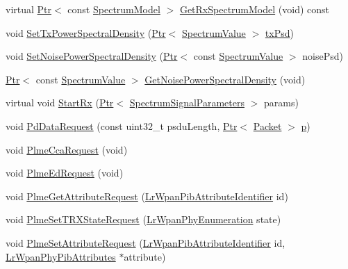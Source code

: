 \begin{DoxyCompactItemize}
virtual \hyperlink{classns3_1_1Ptr}{Ptr}$<$ const \hyperlink{classns3_1_1SpectrumModel}{Spectrum\+Model} $>$ \hyperlink{classns3_1_1LrWpanPhy_a3c13050110824089e8e5fd077388a355}{Get\+Rx\+Spectrum\+Model} (void) const 
\item 
void \hyperlink{classns3_1_1LrWpanPhy_a286fd14131187dac6b1a9b6b3d5eb06c}{Set\+Tx\+Power\+Spectral\+Density} (\hyperlink{classns3_1_1Ptr}{Ptr}$<$ \hyperlink{classns3_1_1SpectrumValue}{Spectrum\+Value} $>$ \hyperlink{lte__link__budget__x2__handover__measures_8m_a684fe3101a5e48a5fcc57cab8dbcd1aa}{tx\+Psd})
\item 
void \hyperlink{classns3_1_1LrWpanPhy_af54dbd30d997764656e91c2d3332b568}{Set\+Noise\+Power\+Spectral\+Density} (\hyperlink{classns3_1_1Ptr}{Ptr}$<$ const \hyperlink{classns3_1_1SpectrumValue}{Spectrum\+Value} $>$ noise\+Psd)
\item 
\hyperlink{classns3_1_1Ptr}{Ptr}$<$ const \hyperlink{classns3_1_1SpectrumValue}{Spectrum\+Value} $>$ \hyperlink{classns3_1_1LrWpanPhy_a66ea1d4c8240f56dd32c14335774f8fd}{Get\+Noise\+Power\+Spectral\+Density} (void)
\item 
virtual void \hyperlink{classns3_1_1LrWpanPhy_a0009842c2fb1be73d1ad437ca0e28b73}{Start\+Rx} (\hyperlink{classns3_1_1Ptr}{Ptr}$<$ \hyperlink{structns3_1_1SpectrumSignalParameters}{Spectrum\+Signal\+Parameters} $>$ params)
\item 
void \hyperlink{classns3_1_1LrWpanPhy_a44d119b7c56658e97c99d9524e42f48f}{Pd\+Data\+Request} (const uint32\+\_\+t psdu\+Length, \hyperlink{classns3_1_1Ptr}{Ptr}$<$ \hyperlink{classns3_1_1Packet}{Packet} $>$ \hyperlink{lte__link__budget__x2__handover__measures_8m_ac9de518908a968428863f829398a4e62}{p})
\item 
void \hyperlink{classns3_1_1LrWpanPhy_a3297797eba6c7423a76c502c80dd0bf1}{Plme\+Cca\+Request} (void)
\item 
void \hyperlink{classns3_1_1LrWpanPhy_a344dd99555091413adab8834bdc11dea}{Plme\+Ed\+Request} (void)
\item 
void \hyperlink{classns3_1_1LrWpanPhy_a293ea127afcf2c575ceba18d5a680b47}{Plme\+Get\+Attribute\+Request} (\hyperlink{group__lr-wpan_gae6da9958c1a7194ce9160d866d4164bc}{Lr\+Wpan\+Pib\+Attribute\+Identifier} id)
\item 
void \hyperlink{classns3_1_1LrWpanPhy_a250bd133e6781745e652c8f3a3c7badc}{Plme\+Set\+T\+R\+X\+State\+Request} (\hyperlink{group__lr-wpan_ga6494269d13d45c511a07b7ccbb1de754}{Lr\+Wpan\+Phy\+Enumeration} state)
\item 
void \hyperlink{classns3_1_1LrWpanPhy_ab535125df10aec4ccfe0b49d970aa117}{Plme\+Set\+Attribute\+Request} (\hyperlink{group__lr-wpan_gae6da9958c1a7194ce9160d866d4164bc}{Lr\+Wpan\+Pib\+Attribute\+Identifier} id, \hyperlink{structns3_1_1LrWpanPhyPibAttributes}{Lr\+Wpan\+Phy\+Pib\+Attributes} $\ast$attribute)

\end{DoxyCompactItemize}
